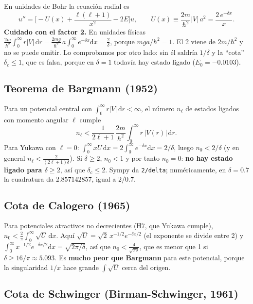 \documentclass[11pt]{article}
\newcommand{\dd}{\mathrm{d}}
\newcommand{\dc}{\delta_c}
\begin{document}
En unidades de Bohr la ecuación radial es
\[
u''=\Big[-U(x)+\frac{\ell(\ell+1)}{x^2}-2E\Big]u,\qquad U(x)\equiv\frac{2m}{\hbar^2}|V|\,a^2=\frac{2\,e^{-\delta x}}{x}.
\]
\textbf{Cuidado con el factor 2.} En unidades físicas $\frac{2m}{\hbar^2}\int_0^\infty r|V|\,\dd r=\frac{2mg}{\hbar^2}\,a\int_0^\infty e^{-\delta x}\dd x=\frac{2}{\delta}$, porque $mga/\hbar^2=1$. El 2 viene de $2m/\hbar^2$ y no se puede omitir. Lo comprobamos por otro lado: sin él saldría $1/\delta$ y la ``cota'' $\dc\le1$, que es falsa, porque en $\delta=1$ todavía hay estado ligado ($E_0=-0.0103$).

\subsection{Teorema de Bargmann (1952)}

Para un potencial central con $\int_0^\infty r|V|\,\dd r<\infty$, el número $n_\ell$ de estados ligados con momento angular $\ell$ cumple
\[
n_\ell<\frac{1}{2\ell+1}\,\frac{2m}{\hbar^2}\int_0^\infty r\,|V(r)|\,\dd r .
\]
Para Yukawa con $\ell=0$: $\int_0^\infty xU\,\dd x=2\int_0^\infty e^{-\delta x}\dd x=2/\delta$, luego $n_0<2/\delta$ (y en general $n_\ell<\frac{2}{(2\ell+1)\delta}$). Si $\delta\ge2$, $n_0<1$ y por tanto $n_0=0$: \textbf{no hay estado ligado para $\delta\ge2$}, así que $\dc\le2$. Sympy da \texttt{2/delta}; numéricamente, en $\delta=0.7$ la cuadratura da $2.857142857$, igual a $2/0.7$.

\subsection{Cota de Calogero (1965)}

Para potenciales atractivos no decrecientes (H7, que Yukawa cumple), $n_0<\frac{2}{\pi}\int_0^\infty\sqrt{U}\,\dd x$. Aquí $\sqrt U=\sqrt2\,x^{-1/2}e^{-\delta x/2}$ (el exponente se divide entre 2) y $\int_0^\infty x^{-1/2}e^{-\delta x/2}\dd x=\sqrt{2\pi/\delta}$, así que $n_0<\frac{4}{\sqrt{\pi\delta}}$, que es menor que 1 si $\delta\ge16/\pi\approx5.093$. Es \textbf{mucho peor que Bargmann} para este potencial, porque la singularidad $1/x$ hace grande $\int\sqrt U$ cerca del origen.

\subsection{Cota de Schwinger (Birman-Schwinger, 1961)}
\end{document}

